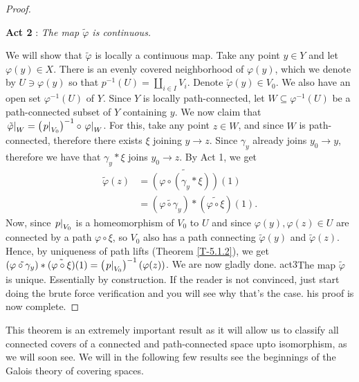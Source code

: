 \documentclass[letterpaper,11pt,twoside]{article}
\theoremstyle{definition}
\theoremstyle{definition}
\theoremstyle{definition}
\theoremstyle{definition}
\theoremstyle{definition}
\theoremstyle{definition}
\theoremstyle{remark}
\theoremstyle{definition}
\newenvironment{act}[2]{\begin{center}
		\textbf{Act #1} : \textit{#2}
	\end{center}
}
\newcommand{\rest}[2]{\left. { #1 }\right \vert_{#2}}
\newcommand{\inv}[1]{\left(#1\right)^{-1}}
\begin{document}
\begin{proof}
\begin{act}{2}{The map $ \tilde{\varphi} $ is continuous.}
		We will show that $ \tilde{\varphi} $ is locally a continuous map. Take any point $ y\in Y $ and let $ \varphi(y) \in X$. There is an evenly covered neighborhood of $ \varphi(y) $, which we denote by $ U \ni \varphi(y) $ so that $ p^{-1}(U) = \coprod_{i\in I} V_i $. Denote $ \tilde{\varphi}(y)\in V_0 $. We also have an open set $ \varphi^{-1}(U) $ of $ Y $. Since $ Y $ is locally path-connected, let $ W \subseteq \varphi^{-1}(U) $ be a path-connected subset of $ Y $ containing $ y $. We now claim that $ \rest{\tilde{\varphi}}{W} = \inv{\rest{p}{V_0}}\circ \rest{\varphi}{W} $. For this, take any point $ z\in W $, and since $ W $ is path-connected, therefore there exists $ \xi $ joining $ y \to z$. Since $ \gamma_y $ already joins $ y_0 \to y $, therefore we have that $ \gamma_y * \xi $ joins $ y_0 \to z$. By Act 1, we get
		\begin{align*}
			\tilde\varphi(z)&= \tilde{\left (\varphi\circ (\gamma_y*\xi)\right )}(1)\\
			&= (\tilde{\varphi\circ \gamma_y})*(\tilde{\varphi\circ \xi})(1).
		\end{align*}
		Now, since $ \rest{p}{V_{0}} $ is a homeomorphism of $ V_0 $ to $ U $ and since $ \varphi(y),\varphi(z)\in U $ are connected by a path $ \varphi \circ \xi $, so $ V_0 $ also has a path connecting $ \tilde{\varphi}(y) $ and $ \tilde{\varphi}(z) $. Hence, by uniqueness of path lifts (Theorem \ref{T-5.1.2}), we get $ (\tilde{\varphi\circ \gamma_y})*(\tilde{\varphi\circ \xi})(1) = \inv{\rest{p}{V_0}}(\varphi(z)) $. We are now gladly done.
	\end{act}
	\begin{act}{3}{The map $ \tilde{\varphi} $ is unique.}
		Essentially by construction. If the reader is not convinced, just start doing the brute force verification and you will see why that's the case.
	\end{act}
	This proof is now complete.
\end{proof}
This theorem is an extremely important result as it will allow us to classify all connected covers of a connected and path-connected space upto isomorphism, as we will soon see. We will in the following few results see the beginnings of the Galois theory of covering spaces.
\end{document}
